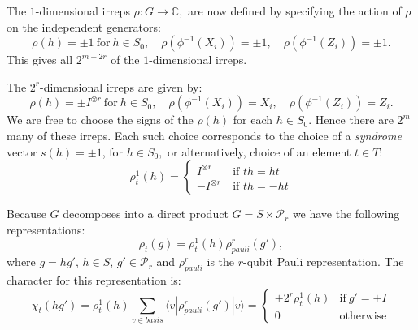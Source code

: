 \documentclass[11pt,oneside]{article}
\def\Complex{\mathbb{C}}
\def\Pauli{\mathcal{P}}
\def\Stab{S}
\begin{document}
The $1$-dimensional irreps $\rho:G\to \Complex,$
are now defined by
specifying the action of $\rho$ on the independent generators:
$$
    \rho(h)=\pm 1\ \mbox{for}\ h\in \Stab_0,
    \quad \rho(\phi^{-1}(X_i)) = \pm 1,\quad \rho(\phi^{-1}(Z_i)) = \pm 1.
$$
This gives all $2^{m+2r}$ of the $1$-dimensional irreps.

The $2^r$-dimensional irreps are given by:
$$
    \rho(h) = \pm I^{\otimes r}\ \mbox{for}\ h\in \Stab_0,
    \quad \rho(\phi^{-1}(X_i)) = X_i,\quad \rho(\phi^{-1}(Z_i)) = Z_i.
$$
We are free to choose the signs of the $\rho(h)$ for each $h\in \Stab_0.$
Hence there are $2^m$ many of these irreps.
Each such choice corresponds to the choice of a {\it syndrome} vector $s(h)=\pm 1$, for $h \in \Stab_0,$
or alternatively, choice of an element $t\in T:$
$$
    \rho^1_t(h) = \left\{ \begin{array}{ll}
 I^{\otimes r}\ &\mbox{if $th=ht$}\\
 -I^{\otimes r}\ &\mbox{if $th=-ht$}\end{array} \right. %
$$


Because $G$ decomposes 
into a direct product $G=\Stab\times \Pauli_r$ we have the
following representations:
$$
    \rho_t(g) = \rho^1_t(h) \rho^r_{pauli}(g'),
$$
where $g=hg'$, $h\in \Stab$, $g'\in \Pauli_r$ 
and $\rho^r_{pauli}$ is the $r$-qubit Pauli representation.
The character for this representation is:
$$
\chi_{t}(hg') = \rho_t^1(h) \sum_{v \in basis} \langle v | \rho^r_{{pauli}}(g') | v \rangle
    = \left\{ \begin{array}{ll}
 \pm 2^r\rho_t^1(h) &\mbox{if}\ g'=\pm I\\
 0 &\mbox{otherwise}\end{array}\right.
$$
\end{document}
